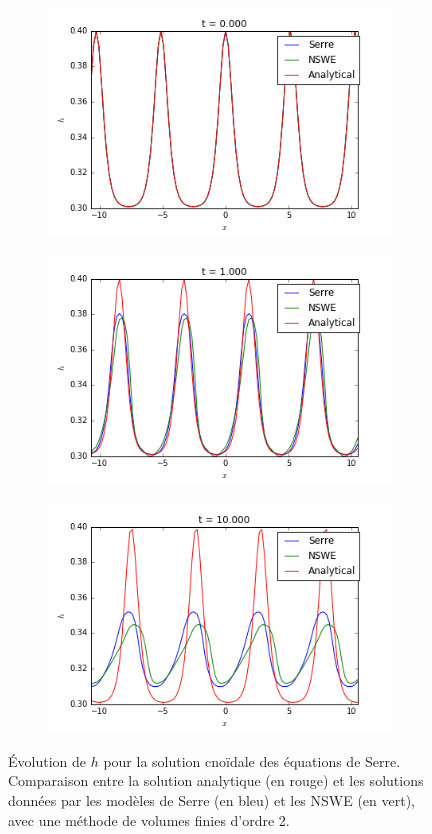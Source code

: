 \begin{figure}[h!]
	\begin{subfigure}{.3\linewidth}
		\includegraphics[scale=.3]{figures/Serre/cnoidal1h.png}	
	\end{subfigure}
	\begin{subfigure}{.3\linewidth}
		\includegraphics[scale=.3]{figures/Serre/cnoidal2h.png}	
	\end{subfigure}
	\begin{subfigure}{.3\linewidth}
		\includegraphics[scale=.3]{figures/Serre/cnoidal3h.png}	
	\end{subfigure}
	\caption{Évolution de $h$ pour la solution cnoïdale des équations de Serre. Comparaison entre la solution analytique (en rouge) et les solutions données par les modèles de Serre (en bleu) et les NSWE (en vert), avec une méthode de volumes finies d'ordre 2. \label{fig:cnoidalhOrdre2}}
\end{figure}